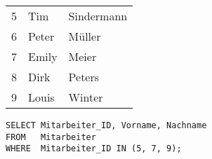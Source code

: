           \begin{center}
            \begin{small}
              \tablehead{}
              \begin{msoraclesql}
                \begin{supertabular}{rll}
                5 & Tim & Sindermann \\
                6 & Peter & Müller \\
                7 & Emily & Meier \\
                8 & Dirk & Peters \\
                9 & Louis & Winter \\
                \end{supertabular}
              \end{msoraclesql}
            \end{small}
          \end{center}
          \begin{lstlisting}[language=oracle_sql,caption={Alle Zeilen aus einer Wertemenge anzeigen},label=sql02_05]
SELECT Mitarbeiter_ID, Vorname, Nachname
FROM   Mitarbeiter
WHERE  Mitarbeiter_ID IN (5, 7, 9);
          \end{lstlisting}
